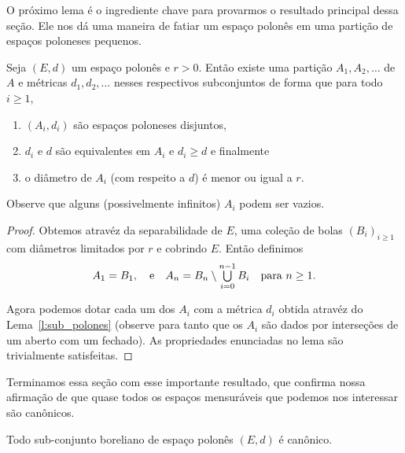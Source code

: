 O próximo lema é o ingrediente chave para provarmos o resultado principal dessa seção.
Ele nos dá uma maneira de fatiar um espaço polonês em uma partição de espaços poloneses pequenos.

\begin{lemma}
  \label{l:particao_polones}
  Seja $(E, d)$ um espaço polonês e $r > 0$.
  Então existe uma partição $A_1, A_2, \dots$ de $A$ e métricas $d_1, d_2, \dots$ nesses respectivos subconjuntos de forma que para todo $i \geq 1$,
  \begin{enumerate}[\quad a)]
  \item $(A_i, d_i)$ são espaços poloneses disjuntos,
  \item $d_i$ e $d$ são equivalentes em $A_i$ e $d_i \geq d$ e finalmente
  \item o diâmetro de $A_i$ (com respeito a $d$) é menor ou igual a $r$.
  \end{enumerate}
  Observe que alguns (possivelmente infinitos) $A_i$ podem ser vazios.
\end{lemma}

\begin{proof}
  Obtemos atravéz da separabilidade de $E$, uma coleção de bolas $(B_i)_{i \geq 1}$ com diâmetros limitados por $r$ e cobrindo $E$.
  Então definimos
  \begin{equation}
    A_1 = B_1, \quad \text{e} \quad A_n = B_n \setminus \operatorname*{{\textstyle \bigcup}}_{i=0}^{n-1} B_i \quad \text{para $n \geq 1$.}
  \end{equation}

  Agora podemos dotar cada um dos $A_i$ com a métrica $d_i$ obtida atravéz do Lema~\ref{l:sub_polones} (observe para tanto que os $A_i$ são dados por interseções de um aberto com um fechado).
  As propriedades enunciadas no lema são trivialmente satisfeitas.
\end{proof}

Terminamos essa seção com esse importante resultado, que confirma nossa afirmação de que quase todos os espaços mensuráveis que podemos nos interessar são canônicos.

\begin{theorem}
  Todo sub-conjunto boreliano de espaço polonês $(E, d)$ é canônico.
\end{theorem}

